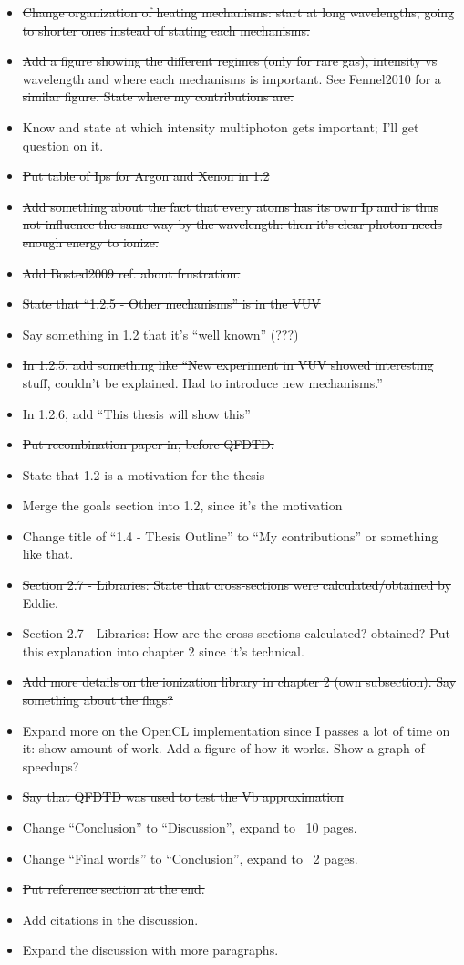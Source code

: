 \begin{itemize}
\item \sout{Change organization of heating mechanisms: start at long wavelengths, going
to shorter ones instead of stating each mechanisms.}
\item \sout{Add a figure showing the different regimes (only for rare gas), intensity
vs wavelength and where each mechanisms is important. See Fennel2010 for a
similar figure. State where my contributions are.}
\item Know and state at which intensity multiphoton gets important; I'll get
question on it.
\item \sout{Put table of Ips for Argon and Xenon in 1.2}
\item \sout{Add something about the fact that every atoms has its own Ip and is thus
not influence the same way by the wavelength: then it's clear photon needs
enough energy to ionize.}
\item \sout{Add Bosted2009 ref. about frustration.}
\item \sout{State that ``1.2.5 - Other mechanisms'' is in the VUV}
\item Say something in 1.2 that it's ``well known'' (???)
\item \sout{In 1.2.5, add something like ``New experiment in VUV showed interesting
stuff, couldn't be explained. Had to introduce new mechanisms.''}
\item \sout{In 1.2.6, add ``This thesis will show this''}
\item \sout{Put recombination paper in, before QFDTD.}
\item State that 1.2 is a motivation for the thesis
\item Merge the goals section into 1.2, since it's the motivation
\item Change title of ``1.4 - Thesis Outline'' to ``My contributions'' or
something like that.
\item \sout{Section 2.7 - Libraries: State that cross-sections were calculated/obtained
by Eddie.}
\item Section 2.7 - Libraries: How are the cross-sections calculated? obtained?
Put this explanation into chapter 2 since it's technical.
\item \sout{Add more details on the ionization library in chapter 2 (own subsection).
Say something about the flags?}
\item Expand more on the OpenCL implementation since I passes a lot of time on
it: show amount of work. Add a figure of how it works. Show a graph of speedups?
\item \sout{Say that QFDTD was used to test the Vb approximation}
\item Change ``Conclusion'' to ``Discussion'', expand to ~10 pages.
\item Change ``Final words'' to ``Conclusion'', expand to ~2 pages.
\item \sout{Put reference section at the end.}
\item Add citations in the discussion.
\item Expand the discussion with more paragraphs.
\end{itemize}

